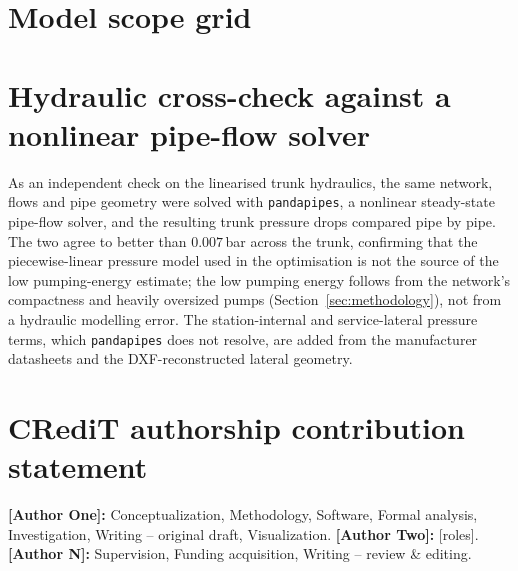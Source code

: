 \documentclass[a4paper,fleqn]{cas-dc}
\begin{document}
\section{Model scope grid}\label{app:scopegrid}


\section{Hydraulic cross-check against a nonlinear pipe-flow solver}\label{app:pandapipes}
As an independent check on the linearised trunk hydraulics, the same network, flows and pipe
geometry were solved with \texttt{pandapipes}, a nonlinear steady-state pipe-flow solver, and
the resulting trunk pressure drops compared pipe by pipe. The two agree to better than
$0.007$\,bar across the trunk, confirming that the piecewise-linear pressure model used in the
optimisation is not the source of the low pumping-energy estimate; the low pumping energy
follows from the network's compactness and heavily oversized pumps (Section~\ref{sec:methodology}),
not from a hydraulic modelling error. The station-internal and service-lateral pressure terms,
which \texttt{pandapipes} does not resolve, are added from the manufacturer datasheets and the
DXF-reconstructed lateral geometry.


\section*{CRediT authorship contribution statement}
\textbf{[Author One]:} Conceptualization, Methodology, Software, Formal analysis, Investigation,
Writing -- original draft, Visualization. \textbf{[Author Two]:} [roles].
\textbf{[Author N]:} Supervision, Funding acquisition, Writing -- review \& editing.


\end{document}
